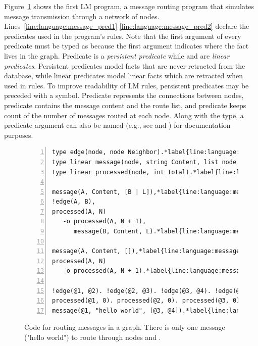 
Figure~\ref{code:language:message} shows the first LM program, a message routing
program that simulates message transmission through a network of nodes.
Lines~\ref{line:language:message_pred1}-\ref{line:language:message_pred2}
declare the predicates used in the program's rules. Note that the first argument
of every predicate must be typed as  because the first argument
indicates where the fact lives in the graph. Predicate  is a
\emph{persistent predicate} while  and  are
\emph{linear predicates}. Persistent predicates model facts that are never
retracted from the database, while linear predicates model linear facts which
are retracted when used in rules. To improve readability of LM rules, persistent
predicates may be preceded with a \code{!} symbol. Predicate 
represents the connections between nodes, predicate  contains the
message content and the route list, and predicate  keeps count
of the number of messages routed at each node. Along with the type, a predicate
argument can also be named (e.g., see  and ) for
documentation purposes.

\begin{figure}[h!]
\begin{Verbatim}[numbers=left,commandchars=\*\{\},fontsize=\codesize]
type edge(node, node Neighbor).*label{line:language:message_pred1}*hfill// Predicate declaration.
type linear message(node, string Content, list node Routing).
type linear processed(node, int Total).*label{line:language:message_pred2}

message(A, Content, [B | L]),*label{line:language:message_first1}*hfill// Rule 1.
!edge(A, B),
processed(A, N)
   -o processed(A, N + 1),
      message(B, Content, L).*label{line:language:message_first2}

message(A, Content, []),*label{line:language:message_second1}*hfill// Rule 2.
processed(A, N)
   -o processed(A, N + 1).*label{line:language:message_second2}

!edge(@1, @2). !edge(@2, @3). !edge(@3, @4). !edge(@1, @3).*label{line:language:message_axioms}*hfill// Initial facts.
processed(@1, 0). processed(@2, 0). processed(@3, 0). processed(@4, 0).
message(@1, "hello world", [@3, @4]).*label{line:language:message_message}
\end{Verbatim}
\caption{Code for routing messages in a graph. There is only one message ("hello
world") to route through nodes  and .}
\label{code:language:message}
\end{figure}

